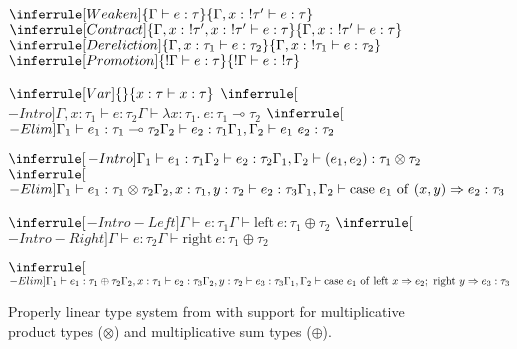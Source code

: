 \begin{mdframed}
\begin{figure}[H]
		\begin{mathpar}
			$\inferrule[Weaken]{\Gamma \vdash e : \tau}{\Gamma, x :\ !\tau' \vdash e : \tau}$ \hspace{1.5em}
			$\inferrule[Contract]{\Gamma, x :\ !\tau', x :\ !\tau' \vdash e : \tau}{\Gamma, x :\ !\tau' \vdash e : \tau}$ \hspace{1.5em}
			$\inferrule[Dereliction]{\Gamma, x : \tau_1 \vdash e : \tau_2}{\Gamma, x :\ !\tau_1 \vdash e : \tau_2}$ \hspace{1.5em}
			$\inferrule[Promotion]{!\Gamma \vdash e : \tau}{!\Gamma \vdash e :\ !\tau}$ \hspace{1.5em}
		\end{mathpar} 
		\begin{mathpar}
			$\inferrule[Var]{ }{x : \tau \vdash x : \tau}$ \hspace{1.5em}
			$\inferrule[$\multimap$-Intro]{\Gamma, x : \tau_1 \vdash e : \tau_2}{\Gamma \vdash \lambda x : \tau_1.\ e : \tau_1 \multimap \tau_2}$ \hspace{1.5em}
			$\inferrule[$\multimap$-Elim]{\Gamma_1 \vdash e_1 : \tau_1 \multimap \tau_2 \\ \Gamma_2 \vdash e_2 : \tau_1}{\Gamma_1, \Gamma_2 \vdash e_1\ e_2 : \tau_2}$
		\end{mathpar}
		\begin{mathpar}
			$\inferrule[$\otimes$-Intro]{\Gamma_1 \vdash e_1 : \tau_1 \\ \Gamma_2 \vdash e_2 : \tau_2}{\Gamma_1, \Gamma_2 \vdash (e_1, e_2) : \tau_1 \otimes \tau_2}$ \hspace{1.5em}
			$\inferrule[$\otimes$-Elim]{\Gamma_1 \vdash e_1 : \tau_1 \otimes \tau_2 \\ \Gamma_2, x : \tau_1, y : \tau_2 \vdash e_2 : \tau_3}{\Gamma_1, \Gamma_2 \vdash \mathrm{case}\ e_1\ \mathrm{of}\ (x, y) \Rightarrow e_2 : \tau_3}$
		\end{mathpar}
		\begin{mathpar}
			$\inferrule[$\oplus$-Intro-Left]{\Gamma \vdash e : \tau_1}{\Gamma \vdash \mathrm{left}\ e : \tau_1 \oplus \tau_2}$ \hspace{1.5em}
			$\inferrule[$\oplus$-Intro-Right]{\Gamma \vdash e : \tau_2}{\Gamma \vdash \mathrm{right}\ e : \tau_1 \oplus \tau_2}$ 
		\end{mathpar}
		\begin{mathpar}
			$\inferrule[$\oplus$-Elim]{\Gamma_1 \vdash e_1 : \tau_1 \oplus \tau_2 \\ \Gamma_2, x : \tau_1 \vdash e_2 : \tau_3 \\ \Gamma_2, y : \tau_2 \vdash e_3 : \tau_3}{\Gamma_1, \Gamma_2 \vdash \mathrm{case}\ e_1\ \mathrm{of}\ \mathrm{left}\ x \Rightarrow e_2;\ \mathrm{right}\ y \Rightarrow e_3 : \tau_3}$
		\end{mathpar}
	\caption{Properly linear type system from \citep{wadler_is_1991} with support for multiplicative product types ($\otimes$) and multiplicative sum types ($\oplus$).}
	\label{fig:wadler-properly-linear}
\end{figure}
\end{mdframed}
